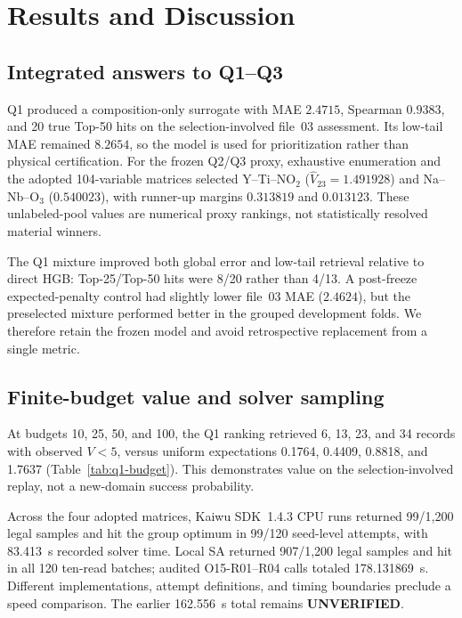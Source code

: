 \section{Results and Discussion}
\label{sec:results-discussion}

\subsection{Integrated answers to Q1--Q3}

Q1 produced a composition-only surrogate with MAE $2.4715$, Spearman
$0.9383$, and 20 true Top-50 hits on the selection-involved file~03
assessment.  Its low-tail MAE remained $8.2654$, so the model is used for
prioritization rather than physical certification.  For the frozen Q2/Q3
proxy, exhaustive enumeration and the adopted 104-variable matrices selected
Y--Ti--$\mathrm{NO}_2$ ($\widehat V_{23}=1.491928$) and
Na--Nb--$\mathrm O_3$ ($0.540023$), with runner-up margins $0.313819$ and
$0.013123$.  These unlabeled-pool values are numerical proxy rankings, not
statistically resolved material winners.

The Q1 mixture improved both global error and low-tail retrieval relative to
direct HGB: Top-25/Top-50 hits were 8/20 rather than 4/13.  A post-freeze
expected-penalty control had slightly lower file~03 MAE ($2.4624$), but the
preselected mixture performed better in the grouped development folds.  We
therefore retain the frozen model and avoid retrospective replacement from a
single metric.

\subsection{Finite-budget value and solver sampling}

At budgets 10, 25, 50, and 100, the Q1 ranking retrieved 6, 13, 23, and 34
records with observed $V<5$, versus uniform expectations 0.1764, 0.4409,
0.8818, and 1.7637 (Table~\ref{tab:q1-budget}).  This demonstrates value on
the selection-involved replay, not a new-domain success probability.

Across the four adopted matrices, Kaiwu SDK~1.4.3 CPU runs returned 99/1,200
legal samples and hit the group optimum in 99/120 seed-level attempts, with
83.413~s recorded solver time.  Local SA returned 907/1,200 legal samples and
hit in all 120 ten-read batches; audited O15-R01--R04 calls totaled
178.131869~s.  Different implementations, attempt definitions, and timing
boundaries preclude a speed comparison.  The earlier 162.556~s total remains
\textbf{UNVERIFIED}.

